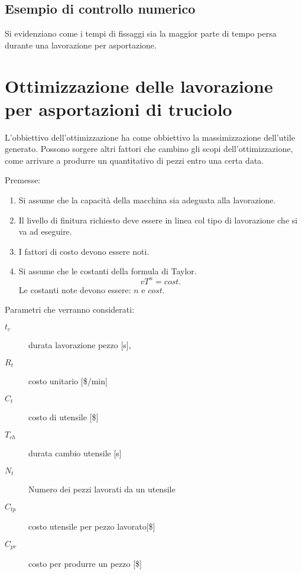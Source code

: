 \subsection{Esempio di controllo numerico}
Si evidenziano come i tempi di fissaggi sia la maggior parte di tempo persa durante una lavorazione per asportazione.

\section{Ottimizzazione delle lavorazione per asportazioni di truciolo}
L'obbiettivo dell'ottimizzazione ha come obbiettivo la massimizzazione dell'utile generato.
Possono sorgere altri fattori che cambino gli scopi dell'ottimizzazione, come arrivare a produrre un quantitativo di pezzi entro una certa data.

Premesse:
\begin{enumerate}
\item Si assume che la capacità della macchina sia adeguata alla lavorazione.
\item Il livello di finitura richiesto deve essere in linea col tipo di lavorazione che si va ad eseguire.
\item I fattori di costo devono essere noti.
\item Si assume che le costanti della formula di Taylor.
\begin{equation}
vT^n = cost.
\end{equation}
Le costanti note devono essere: $n$ e $cost.$
\end{enumerate}
Parametri che verranno considerati:
\begin{description}
\item[$t_c$] durata lavorazione pezzo [s],
\item[$R_t$] costo unitario [\$/min]
\item[$C_t$] costo di utensile [\$]
\item[$T_{ch}$] durata cambio utensile [s]
\item[$N_t$] Numero dei pezzi lavorati da un utensile
\item[$C_{tp}$] costo utensile per pezzo lavorato[\$]
\item[$C_{pr}$] costo per produrre un pezzo [\$]
\end{description}

